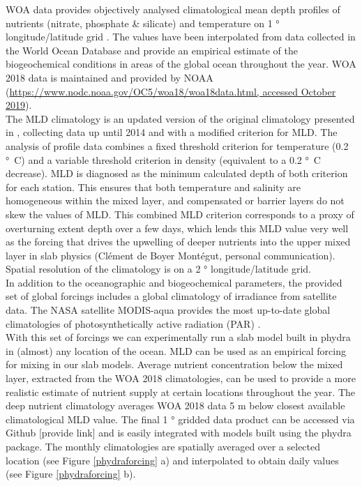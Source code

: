 \documentclass[template.tex]{subfiles}
\begin{document}
WOA data provides objectively analysed climatological mean depth profiles of nutrients (nitrate, phosphate \& silicate) and temperature on 1 \unit{°} longitude/latitude grid \cite{Garcia2019WORLDSilicate}. The values have been interpolated from data collected in the World Ocean Database and provide an empirical estimate of the biogeochemical conditions in areas of the global ocean throughout the year. WOA 2018 data is maintained and provided by NOAA (\url{https://www.nodc.noaa.gov/OC5/woa18/woa18data.html, accessed October 2019}).\\

The MLD climatology is an updated version of the original climatology presented in  \citet{deBoyerMontegut2004MixedClimatology}, collecting data up until 2014 and with a modified criterion for MLD. The analysis of profile data combines a fixed threshold criterion for temperature (0.2 \unit{°C}) and a variable threshold criterion in density (equivalent to a 0.2 \unit{°C} decrease). MLD is diagnosed as the minimum calculated depth of both criterion for each station. This ensures that both temperature and salinity are homogeneous within the mixed layer, and compensated or barrier layers do not skew the values of MLD. This combined MLD criterion corresponds to a proxy of overturning extent depth over a few days, which lends this MLD value very well as the forcing that drives the upwelling of deeper nutrients into the upper mixed layer in slab physics (Clément de Boyer Montégut, personal communication). Spatial resolution of the climatology is on a 2 \unit{°} longitude/latitude grid.\\

In addition to the oceanographic and biogeochemical parameters, the provided set of global forcings includes a global climatology of irradiance from satellite data. The NASA satellite MODIS-aqua provides the most up-to-date global climatologies of photosynthetically active radiation (PAR) \cite{MODIS-Aqua2018NASAGroup}. 
\\
With this set of forcings we can experimentally run a slab model built in phydra in (almost) any location of the ocean. MLD can be used as an empirical forcing for mixing in our slab models. Average nutrient concentration below the mixed layer, extracted from the WOA 2018 climatologies, can be used to provide a more realistic estimate of nutrient supply at certain locations throughout the year. The deep nutrient climatology averages WOA 2018 data 5 \unit{m} below closest available climatological MLD value. The final 1 \unit{°} gridded data product can be accessed via Github [provide link] and is easily integrated with models built using the phydra package. 
The monthly climatologies are spatially averaged over a selected location (see Figure \ref{phydraforcing} a) and interpolated to obtain daily values (see Figure \ref{phydraforcing} b).



\biblio
\end{document}
